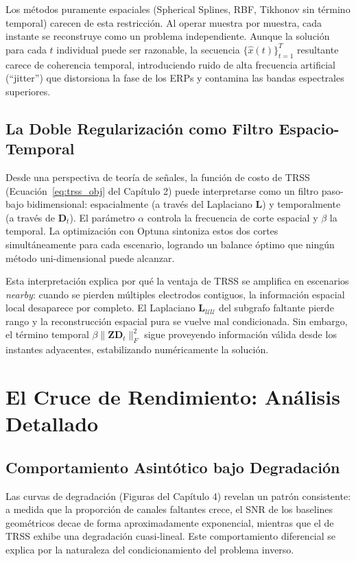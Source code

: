 Los métodos puramente espaciales (Spherical Splines, RBF, Tikhonov sin término temporal) carecen de esta restricción. Al operar muestra por muestra, cada instante se reconstruye como un problema independiente. Aunque la solución para cada $t$ individual puede ser razonable, la secuencia $\{\hat{x}(t)\}_{t=1}^T$ resultante carece de coherencia temporal, introduciendo ruido de alta frecuencia artificial (``jitter'') que distorsiona la fase de los ERPs y contamina las bandas espectrales superiores.

\subsection{La Doble Regularización como Filtro Espacio-Temporal}

Desde una perspectiva de teoría de señales, la función de costo de TRSS (Ecuación~\ref{eq:trss_obj} del Capítulo 2) puede interpretarse como un filtro paso-bajo bidimensional: espacialmente (a través del Laplaciano $\mathbf{L}$) y temporalmente (a través de $\mathbf{D}_t$). El parámetro $\alpha$ controla la frecuencia de corte espacial y $\beta$ la temporal. La optimización con Optuna sintoniza estos dos cortes simultáneamente para cada escenario, logrando un balance óptimo que ningún método uni-dimensional puede alcanzar.

Esta interpretación explica por qué la ventaja de TRSS se amplifica en escenarios \textit{nearby}: cuando se pierden múltiples electrodos contiguos, la información espacial local desaparece por completo. El Laplaciano $\mathbf{L}_{\mathcal{U}\mathcal{U}}$ del subgrafo faltante pierde rango y la reconstrucción espacial pura se vuelve mal condicionada. Sin embargo, el término temporal $\beta \|\mathbf{Z}\mathbf{D}_t\|_F^2$ sigue proveyendo información válida desde los instantes adyacentes, estabilizando numéricamente la solución.

\section{El Cruce de Rendimiento: Análisis Detallado}

\subsection{Comportamiento Asintótico bajo Degradación}

Las curvas de degradación (Figuras del Capítulo 4) revelan un patrón consistente: a medida que la proporción de canales faltantes crece, el SNR de los baselines geométricos decae de forma aproximadamente exponencial, mientras que el de TRSS exhibe una degradación cuasi-lineal. Este comportamiento diferencial se explica por la naturaleza del condicionamiento del problema inverso.

